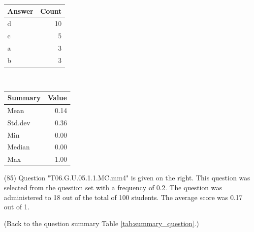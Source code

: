 \documentclass[12pt,nohyper]{tufte-handout}\usepackage[]{graphicx}\usepackage[]{color}
\begin{document}
\begin{center}%
\begin{tabular}{lr}
  \hline
Answer & Count \\ 
  \hline
d &  10 \\ 
  c &   5 \\ 
  a &   3 \\ 
  b &   3 \\ 
   \hline
\end{tabular}
~~~~~~~~%
\begin{tabular}{lr}
  \hline
Summary & Value \\ 
  \hline
Mean & 0.14 \\ 
  Std.dev & 0.36 \\ 
  Min & 0.00 \\ 
  Median & 0.00 \\ 
  Max & 1.00 \\ 
   \hline
\end{tabular}
\end{center}\newpage{} (85) Question "T06.G.U.05.1.1.MC.mm4" is given on the right. This question was selected from the question set with a frequency of 0.2. The question was administered to 18 out of the total of 100 students. The average score was 0.17 out of 1.

 (Back to the question summary Table \ref{tab:summary_question}.)
\end{document}
